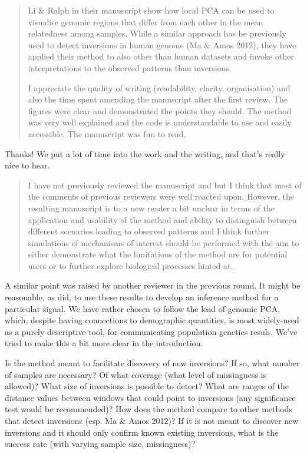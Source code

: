 

\begin{quote}
    Li \& Ralph in their manuscript show how local PCA can be used to visualise genomic regions that differ from each other in the mean relatedness among samples. While a similar approach has be previously used to detect inversions in human genome (Ma \& Amos 2012), they have applied their method to also other than human datasets and invoke other interpretations to the observed patterns than inversions.

    I appreciate the quality of writing (readability, clarity, organisation) and also the time spent amending the manuscript after the first review. The figures were clear and demonstrated the points they should. The method was very well explained and the code is understandable to use and easily accessible. The manuscript was fun to read.
\end{quote}

Thanks!  We put a lot of time into the work and the writing,
and that's really nice to hear.

\begin{quote}
    I have not previously reviewed the manuscript and but I think that most of the comments of previous reviewers were well reacted upon. However, the resulting manuscript is to a new reader a bit unclear in terms of the application and usability of the method and ability to distinguish between different scenarios leading to observed patterns and I think further simulations of mechanisms of interest should be performed with the aim to either demonstrate what the limitations of the method are for potential users or to further explore biological processes hinted at.
\end{quote}

A similar point was raised by another reviewer in the previous round.
It might be reasonable, as \citet{ma2012investigation} did,
to use these results to develop an inference method for a particular signal.
We have rather chosen to follow the lead of genomic PCA,
which, despite having connections to demographic quantities,
is most widely-used as a purely descriptive tool,
for communicating population genetics resuls.
We've tried to make this a bit more clear in the introduction. 


\begin{point}{}
    Is the method meant to facilitate discovery of new inversions? If so, what number of samples are necessary? Of what coverage (what level of missingness is allowed)? What size of inversions is possible to detect? What are ranges of the distance values between windows that could point to inversions (any significance test would be recommended)? How does the method compare to other methods that detect inversions (esp. Ma \& Amos 2012)? If it is not meant to discover new inversions and it should only confirm known existing inversions, what is the success rate (with varying sample size, missingness)?
\end{point}

